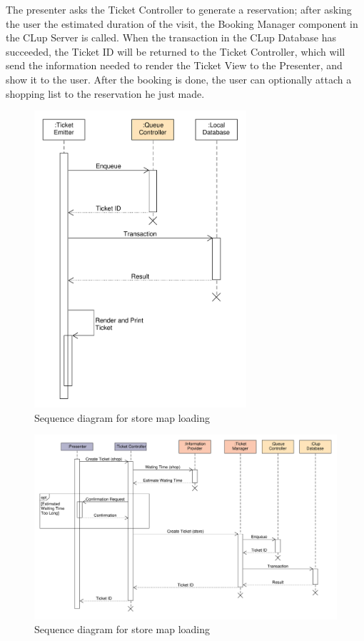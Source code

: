 The presenter asks the Ticket Controller to generate a reservation; after asking the user the estimated duration of the visit, the Booking Manager component in the CLup Server is called.
When the transaction in the CLup Database has succeeded, the Ticket ID will be returned to the Ticket Controller, which will send the information needed to render the Ticket View to the Presenter, and show it to the user. After the booking is done, the user can optionally attach a shopping list to the reservation he just made. 
\begin{figure}[H]
    \includegraphics[width=0.7\textwidth]{Images/UML_paper_ticket_sequence.pdf}
    \caption{\label{fig:UML_paper_ticket_sequence}Sequence diagram for store map loading}
\end{figure}
\begin{figure}[H]
    \includegraphics[width=\textwidth]{Images/UML_virtual_ticket_sequence.pdf}
    \caption{\label{fig:UML_virtual_ticket_sequence}Sequence diagram for store map loading}
\end{figure}

